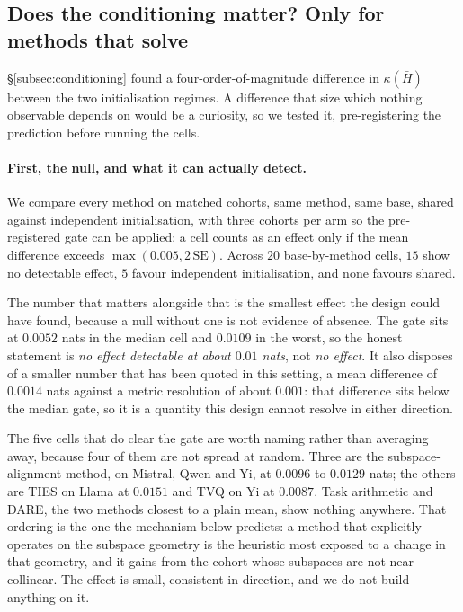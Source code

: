 \subsection{Does the conditioning matter? Only for methods that solve}
\label{subsec:ridge}

\S\ref{subsec:conditioning} found a four-order-of-magnitude difference in
$\kappa(\bar H)$ between the two initialisation regimes. A difference that
size which nothing observable depends on would be a curiosity, so we tested
it, pre-registering the prediction before running the cells.

\paragraph{First, the null, and what it can actually detect.} We compare
every method on matched cohorts, same method, same base, shared against
independent initialisation, with three cohorts per arm so the
pre-registered gate can be applied: a cell counts as an effect only if the
mean difference exceeds $\max(0.005, 2\,\mathrm{SE})$. Across $20$
base-by-method cells, $15$ show no detectable effect, $5$ favour
independent initialisation, and none favours shared.

The number that matters alongside that is the smallest effect the design
could have found, because a null without one is not evidence of absence.
The gate sits at $0.0052$ nats in the median cell and $0.0109$ in the
worst, so the honest statement is \emph{no effect detectable at about
$0.01$ nats}, not \emph{no effect}. It also disposes of a smaller number
that has been quoted in this setting, a mean difference of $0.0014$ nats
against a metric resolution of about $0.001$: that difference sits below
the median gate, so it is a quantity this design cannot resolve in either
direction.

The five cells that do clear the gate are worth naming rather than
averaging away, because four of them are not spread at random. Three are
the subspace-alignment method, on Mistral, Qwen and Yi, at $0.0096$ to
$0.0129$ nats; the others are TIES on Llama at $0.0151$ and TVQ on Yi at
$0.0087$. Task arithmetic and DARE, the two methods closest to a plain
mean, show nothing anywhere. That ordering is the one the mechanism below
predicts: a method that explicitly operates on the subspace geometry is
the heuristic most exposed to a change in that geometry, and it gains from
the cohort whose subspaces are not near-collinear. The effect is small,
consistent in direction, and we do not build anything on it.

